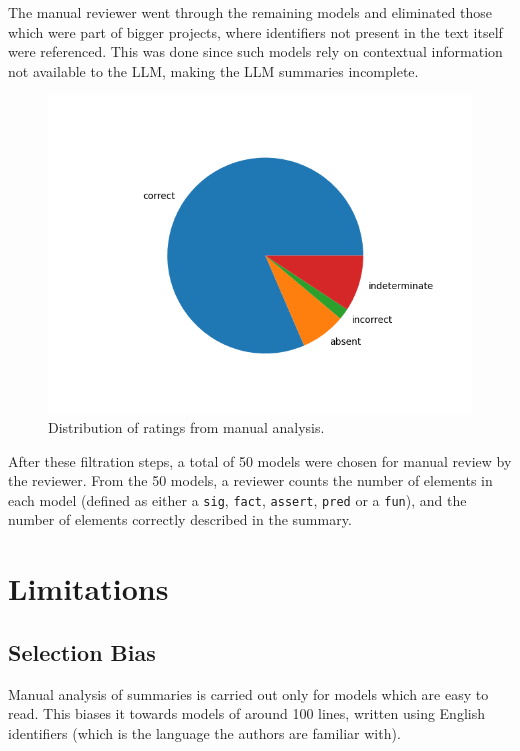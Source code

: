 \documentclass[conference]{IEEEtran}
\begin{document}
The manual reviewer went through the remaining models and eliminated those which were part of bigger projects, where identifiers not present in the text itself were referenced. This was done since such models rely on contextual information not available to the LLM, making the LLM summaries incomplete.

\begin{figure}[htbp]
\centerline{\includegraphics[width=\linewidth]{"./Distribution of ratings from manual analysis.png"}}
\caption{Distribution of ratings from manual analysis.}
\label{fig}
\end{figure}

After these filtration steps, a total of 50 models were chosen for manual review by the reviewer. From the 50 models, a reviewer counts the number of elements in each model (defined as either a \verb|sig|, \verb|fact|, \verb|assert|, \verb|pred| or a \verb|fun|), and the number of elements correctly described in the summary.

\section{Limitations}



\subsection{Selection Bias}

Manual analysis of summaries is carried out only for models which are easy to read. This biases it towards models of around 100 lines, written using English identifiers (which is the language the authors are familiar with).
\end{document}
